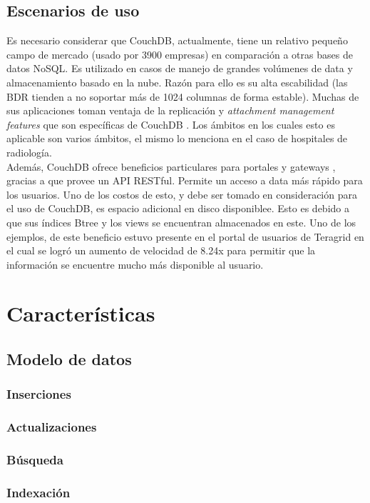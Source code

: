\documentclass{article}
\begin{document}
        \subsection{Escenarios de uso}
            Es necesario considerar que CouchDB, actualmente, tiene un relativo pequeño campo de mercado (usado por 3900 empresas) en comparación a otras bases de datos NoSQL. Es utilizado en casos de manejo de grandes volúmenes de data y almacenamiento basado en la nube. Razón para ello es su alta escabilidad (las BDR tienden a no soportar más de 1024 columnas de forma estable). Muchas de sus aplicaciones toman ventaja de la replicación y \textit{attachment management features} que son específicas de CouchDB \cite{rascovsky}. Los ámbitos en los cuales esto es aplicable son varios ámbitos, el mismo \cite{rascovsky} lo menciona en el caso de hospitales de radiología.\\
            Además, CouchDB ofrece beneficios particulares para portales y gateways \cite{hanlon}, gracias a que provee un API RESTful. Permite un acceso a data más rápido para los usuarios. Uno de los costos de esto, y debe ser tomado en consideración para el uso de CouchDB, es espacio adicional en disco disponiblee. Esto es debido a que sus índices Btree y los views se encuentran almacenados en este. Uno de los ejemplos, de este beneficio estuvo presente en el portal de usuarios de Teragrid en el cual se logró un aumento de velocidad de 8.24x \cite{hanlon} para permitir que la información se encuentre mucho más disponible al usuario.
    \section{Características}
        \subsection{Modelo de datos}
            \subsubsection{Inserciones}
            \subsubsection{Actualizaciones}
            \subsubsection{Búsqueda}
            \subsubsection{Indexación} 
\end{document}
